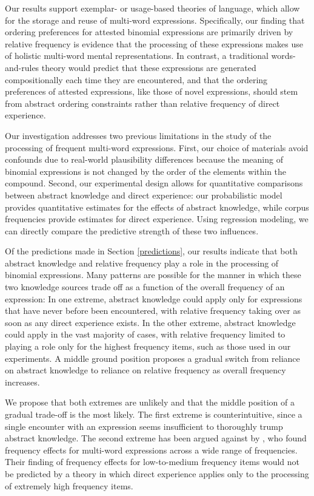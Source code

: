 \documentclass[authoryear]{elsarticle}
\begin{document}
Our results support exemplar- or usage-based theories of language, which allow for the storage and reuse of multi-word expressions. Specifically, our finding that ordering preferences for attested binomial expressions are primarily driven by relative frequency is evidence that the processing of these expressions makes use of holistic multi-word mental representations. In contrast, a traditional words-and-rules theory would predict that these expressions are generated compositionally each time they are encountered, and that the ordering preferences of attested expressions, like those of novel expressions, should stem from abstract ordering constraints rather than relative frequency of direct experience.

Our investigation addresses two previous limitations in the study of the processing of frequent multi-word expressions. First, our choice of materials avoid confounds due to real-world plausibility differences because the meaning of binomial expressions is not changed by the order of the elements within the compound. Second, our experimental design allows for quantitative comparisons between abstract knowledge and direct experience: our probabilistic model provides quantitative estimates for the effects of abstract knowledge, while corpus frequencies provide estimates for direct experience. Using regression modeling, we can directly compare the predictive strength of these two influences.

Of the predictions made in Section \ref{predictions}, our results indicate that both abstract knowledge and relative frequency play a role in the processing of binomial expressions. Many patterns are possible for the manner in which these two knowledge sources trade off as a function of the overall frequency of an expression: In one extreme, abstract knowledge could apply only for expressions that have never before been encountered, with relative frequency taking over as soon as any direct experience exists. In the other extreme, abstract knowledge could apply in the vast majority of cases, with relative frequency limited to playing a role only for the highest frequency items, such as those used in our experiments. A middle ground position proposes a gradual switch from reliance on abstract knowledge to reliance on relative frequency as overall frequency increases.

We propose that both extremes are unlikely and that the middle position of a gradual trade-off is the most likely. The first extreme is counterintuitive, since a single encounter with an expression seems insufficient to thoroughly trump abstract knowledge. The second extreme has been argued against by \citet{Arnon:2010hz}, who found frequency effects for multi-word expressions across a wide range of frequencies. Their finding of frequency effects for low-to-medium frequency items would not be predicted by a theory in which direct experience applies only to the processing of extremely high frequency items.
\end{document}
